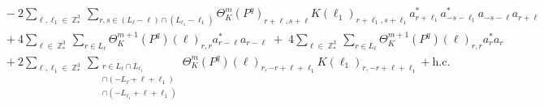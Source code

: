 \documentclass[sn-mathphys, Numbered ,a4paper]{sn-jnl}%
\DeclareMathOperator{\Z}{\mathbb{Z}}
\theoremstyle{plain}
\theoremstyle{definition}
\theoremstyle{remark}
\theoremstyle{plain}
\theoremstyle{definition}
\theoremstyle{remark}
\begin{document}
\begin{align}
	&\quad -2\sum\limits_{\ell,\ell_1 \in \Z^3_*}\sum\limits_{r,s\in (L_{\ell}-\ell)\cap (L_{\ell_1}-\ell_1)} \Theta^m_{K}(P^q)_{r+\ell,s+\ell} K(\ell_1)_{r+\ell_1,s+\ell_1}  a^*_{r+\ell_1}a^*_{-s-\ell_1}a_{-s-\ell}a_{r+\ell}\nonumber\\
	&\quad+4\sum\limits_{\ell \in \Z^3_*} \sum\limits_{r\in L_{\ell}}\Theta^{m+1}_{K}(P^q)(\ell)_{r,r} a^*_{r-\ell}a_{r-\ell} \;+\;4\sum\limits_{\ell \in \Z^3_*} \sum\limits_{r\in L_{\ell}}\Theta^{m+1}_{K}(P^q)(\ell)_{r,r} a^*_{r}a_{r} \nonumber\\
	&\quad + 2 \sum\limits_{\ell,\ell_1 \in \Z^3_*}\sum\limits_{\substack{r\in L_{\ell} \cap L_{\ell_1}\\ \cap (-L_{\ell}+\ell+\ell_1) \\ \cap (-L_{\ell_1}+\ell+\ell_1 )}} \!\!\!\Theta^m_{K}(P^q)(\ell)_{r,-r+\ell+\ell_1}K(\ell_1)_{r,-r+\ell+\ell_1} + \mathrm{h.c.} \label{eq:expandedEQ2}
\end{align}
\end{document}
